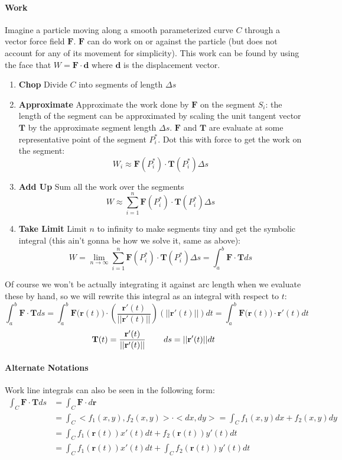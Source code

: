 \documentclass{article}
\begin{document}
\paragraph{Work} Imagine a particle moving along a smooth parameterized curve $C$ through a vector force field $\mathbf{F}$. $\mathbf{F}$ can do work on or against the particle (but does not account for any of its movement for simplicity). This work can be found by using the face that $W = \mathbf{F} \cdot \mathbf{d}$ where $\mathbf{d}$ is the displacement vector. 
\begin{enumerate}
    \item \textbf{Chop} Divide $C$ into segments of length $\Delta s$
    \item \textbf{Approximate} Approximate the work done by $\mathbf{F}$ on the segment $S_i$: the length of the segment can be approximated by scaling the unit tangent vector $\mathbf{T}$ by the approximate segment length $\Delta s$.  $\mathbf{F}$ and $\mathbf{T}$ are evaluate at some representative point of the segment $P_i^*$. Dot this with force to get the work on the segment:
    \[ W_i \approx \mathbf{F}(P_i^*) \cdot \mathbf{T}(P_i^*) \Delta s\]
    \item \textbf{Add Up} Sum all the work over the segments
    \[ W \approx \sum_{i=1}^n \mathbf{F}(P_i^*) \cdot \mathbf{T}(P_i^*) \Delta s\]
    \item \textbf{Take Limit} Limit $n$ to infinity to make segments tiny and get the symbolic integral (this ain't gonna be how we solve it, same as above):
     \[ W = \lim_{n\to\infty} \sum_{i=1}^n \mathbf{F}(P_i^*) \cdot \mathbf{T}(P_i^*) \Delta s = \int_a^b \mathbf{F} \cdot \mathbf{T} ds\]
\end{enumerate}
Of course we won't be actually integrating it against arc length when we evaluate these by hand, so we will rewrite this integral as an integral with respect to $t$:
\[ \int_a^b \mathbf{F} \cdot \mathbf{T} ds = \int_a^b \mathbf{F(r}(t)) \cdot (\frac{\mathbf{r}'(t)}{||\mathbf{r}'(t)||}) (||\mathbf{r}'(t)||)dt = \int_a^b \mathbf{F(r}(t)) \cdot \mathbf{r}'(t)dt\]
\[\mathbf{T}(t) = \frac{\mathbf{r}'(t)}{||\mathbf{r}'(t)||} \hspace{.3in} ds = ||\mathbf{r}'(t)||dt\]

\paragraph{Alternate Notations} Work line integrals can also be seen in the following form:
\begin{align*}
    \int_C \mathbf{F} \cdot \mathbf{T} ds &= \int_C \mathbf{F \cdot} d\mathbf{r} \\
    &= \int_C <f_1(x,y), f_2(x,y)> \cdot <dx, dy> = \int_C f_1(x,y)dx + f_2(x,y) dy \\
    &= \int_C f_1(\mathbf{r}(t))x'(t)dt + f_2(\mathbf{r}(t))y'(t)dt \\
    &= \int_C f_1(\mathbf{r}(t))x'(t)dt + \int_C f_2(\mathbf{r}(t))y'(t)dt
\end{align*}
\end{document}

